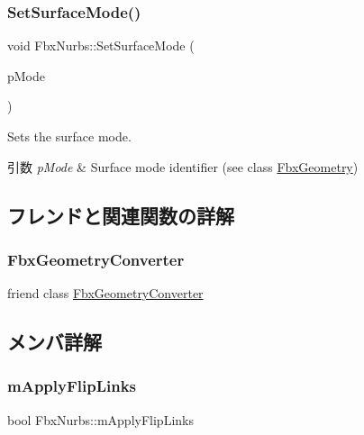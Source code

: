 \subsubsection{\texorpdfstring{Set\+Surface\+Mode()}{SetSurfaceMode()}}
{\footnotesize\ttfamily void Fbx\+Nurbs\+::\+Set\+Surface\+Mode (\begin{DoxyParamCaption}\item[{\hyperlink{class_fbx_geometry_adb9d2e34481a2cb40f1d783c665794db}{Fbx\+Geometry\+::\+E\+Surface\+Mode}}]{p\+Mode }\end{DoxyParamCaption})}

Sets the surface mode. 
\begin{DoxyParams}{引数}
{\em p\+Mode} & Surface mode identifier (see class \hyperlink{class_fbx_geometry}{Fbx\+Geometry}) \\
\hline
\end{DoxyParams}


\subsection{フレンドと関連関数の詳解}
\mbox{\label{class_fbx_nurbs_a2c65afd59c2bab21d92824fbe4422545}} 
\subsubsection{\texorpdfstring{Fbx\+Geometry\+Converter}{FbxGeometryConverter}}
{\footnotesize\ttfamily friend class \hyperlink{class_fbx_geometry_converter}{Fbx\+Geometry\+Converter}\hspace{0.3cm}{\ttfamily [friend]}}



\subsection{メンバ詳解}
\mbox{\label{class_fbx_nurbs_a5776808fc0329e7634bd88eb5b1c5db0}} 
\subsubsection{\texorpdfstring{m\+Apply\+Flip\+Links}{mApplyFlipLinks}}
{\footnotesize\ttfamily bool Fbx\+Nurbs\+::m\+Apply\+Flip\+Links\hspace{0.3cm}{\ttfamily [protected]}}

